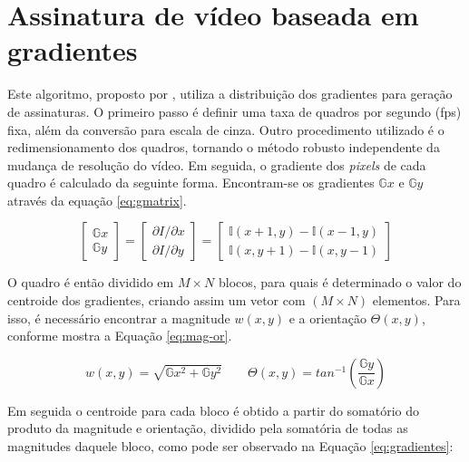 \section{Assinatura de vídeo baseada em gradientes}
\label{sec:gradientes}

	Este algoritmo, proposto por \cite{lee2008robust}, utiliza a distribuição dos gradientes para geração de assinaturas. O primeiro passo é definir uma taxa de quadros por segundo (fps) fixa, além da conversão para escala de cinza. Outro procedimento utilizado é o redimensionamento dos quadros, tornando o  método robusto independente da mudança de resolução do vídeo. Em seguida, o gradiente dos \textit{pixels} de cada quadro é calculado da seguinte forma. Encontram-se os gradientes $\mathbb{G}x$ e $\mathbb{G}y$ através da equação \ref{eq:gmatrix}.

\begin{equation}
  \label{eq:gmatrix}
  \begin{bmatrix}
    \mathbb{G}x
    \\ 
    \mathbb{G}y
  \end{bmatrix}= 
  \begin{bmatrix}
    \partial I/\partial x
    \\ 
    \partial I/\partial y
  \end{bmatrix}=
  \begin{bmatrix}
    \mathbb{I}(x+1, y) - \mathbb{I}(x-1,y)
    \\ 
    \mathbb{I}(x, y+1) - \mathbb{I}(x,y-1)
  \end{bmatrix}
\end{equation}
    
	O quadro é então dividido em $M\times N$ blocos, para quais é determinado o valor do centroide dos gradientes, criando assim um vetor com $(M \times N)$ elementos. Para isso, é necessário encontrar a magnitude \textit{$w(x,y)$} e a orientação \textit{$\Theta(x,y)$}, conforme mostra a Equação \ref{eq:mag-or}.
    
\begin{equation}
	\label{eq:mag-or}
    w(x,y) = \sqrt{\mathbb{G}x^{2} + \mathbb{G}y^{2}}
\qquad
\Theta(x,y) = tan^{-1}\left (\frac{\mathbb{G}y}{\mathbb{G}x} \right)
\end{equation}
    
    Em seguida o centroide para cada bloco é obtido a partir do somatório do produto da magnitude e orientação, dividido pela somatória de todas as magnitudes daquele bloco, como pode ser observado na Equação \ref{eq:gradientes}:
    
